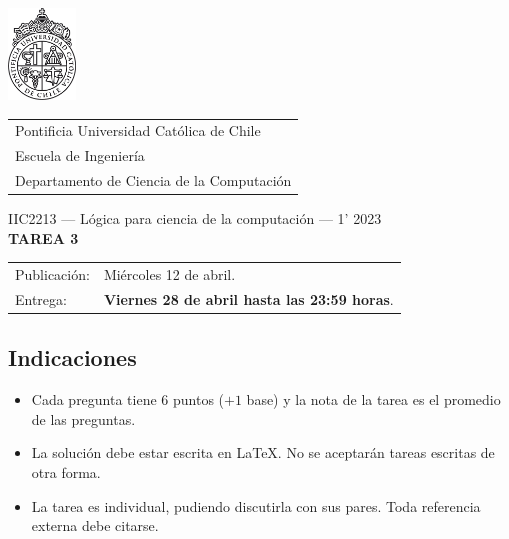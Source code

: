 \documentclass{article}
\begin{document}
\includegraphics[width=1.8cm]{uc.png}
\vspace*{-1.9cm}

\hspace*{2.1cm}
 \begin{tabular}{l}
  \sc Pontificia Universidad Católica de Chile \\
  \sc Escuela de Ingeniería \\
  \sc Departamento de Ciencia de la Computación
 \end{tabular}
 \bigskip

\vspace*{5mm}
\begin{center}
{IIC2213 --- Lógica para ciencia de la computación --- 1' 2023} \\
\vspace{3mm}
{\Large\bf TAREA 3} \\
\vspace{2mm}
\end{center}

\begin{tabular}{ll}
Publicación: & Miércoles 12 de abril. \\
Entrega: & \textbf{Viernes 28 de abril hasta las 23:59 horas}. \\
\end{tabular}

\subsection*{Indicaciones}

\begin{itemize}
\item Cada pregunta tiene 6 puntos ($+1$ base) y la nota de la tarea es el promedio de  las preguntas.
\item La solución debe estar escrita en \LaTeX. No se aceptarán tareas escritas de otra forma.
\item La tarea es individual, pudiendo discutirla con sus pares. Toda referencia externa debe citarse.
\end{itemize}
\end{document}
